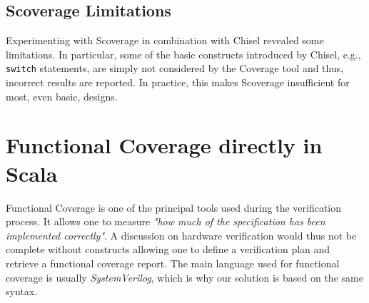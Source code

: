 \documentclass[conference]{IEEEtran}
\begin{document}
\subsection{Scoverage Limitations}
Experimenting with Scoverage in combination with Chisel revealed some limitations. In particular, some of the basic constructs introduced by Chisel, e.g., \texttt{switch} statements, are simply not considered by the Coverage tool and thus, incorrect results are reported. In practice, this makes Scoverage insufficient for most, even basic, designs.

\section{Functional Coverage directly in Scala}
Functional Coverage is one of the principal tools used during the verification process. It allows one to measure \textit{"how much of the specification has been implemented correctly"}. A discussion on hardware verification would thus not be complete without constructs allowing one to define a verification plan and retrieve a functional coverage report. The main language used for functional coverage is usually \textit{SystemVerilog}, which is why our solution is based on the same syntax. 
\end{document}
